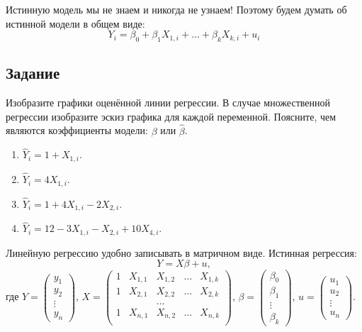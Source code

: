 \documentclass[11pt, a4paper]{extarticle}
\begin{document}
	Истинную модель мы не знаем и никогда не узнаем! Поэтому будем думать об истинной модели в общем виде:
	\[
	Y_i = \beta_0 + \beta_1X_{1, i} + \ldots + \beta_kX_{k, i} + u_i
	\]
	
	\subsection{Задание}
	Изобразите графики оценённой линии регрессии. В случае множественной регрессии изобразите эскиз графика для каждой переменной. Поясните, чем являются коэффициенты модели: $\beta$ или $\hat{\beta}$.
	\begin{multicols}{2}
		\begin{enumerate}[label=\alph*)]
			\item $\hat{Y}_i = 1 + X_{1, i}$.
			\item $\hat{Y}_i = 4X_{1, i}$.
			\item $\hat{Y}_i = 1 + 4X_{1, i} - 2X_{2, i}$.
			\item $\hat{Y}_i = 12 - 3X_{1, i} - X_{2, i} + 10X_{4, i}$.
		\end{enumerate}
	\end{multicols}

	Линейную регрессию удобно записывать в матричном виде. Истинная регрессия:
	\[
	Y = X\beta + u,
	\]
	где $Y = \begin{pmatrix}
	y_1 \\
	y_2 \\
	\vdots \\
	y_n
	\end{pmatrix}$, $X = \begin{pmatrix}
	1 & X_{1,1} & X_{1,2} & \ldots & X_{1,k} \\
	1 & X_{2,1} & X_{2,2} & \ldots & X_{2,k} \\
	&&\ldots \\
	1 & X_{n,1} & X_{n,2} & \ldots & X_{n,k} \\
	\end{pmatrix}$, $\beta = \begin{pmatrix}
	\beta_0 \\
	\beta_1 \\
	\vdots \\
	\beta_k
	\end{pmatrix}$, $u = \begin{pmatrix}
	u_1 \\
	u_2 \\
	\vdots \\
	u_n
	\end{pmatrix}$. \vspace{1em}
	
\end{document}
